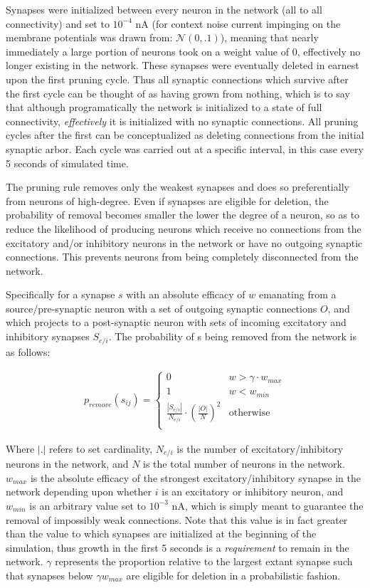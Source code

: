 \documentclass[10pt,letterpaper]{article}
\begin{document}
\label{subsec:prune}
Synapses were initialized between every neuron in the network (all to all connectivity) and set to $10^{-4}$ nA (for context noise current impinging on the membrane potentials was drawn from: $\mathcal{N}(0, .1)$), meaning that nearly immediately a large portion of neurons took on a weight value of 0, effectively no longer existing in the network. These synapses were eventually deleted in earnest upon the first pruning cycle. Thus all synaptic connections which survive after the first cycle can be thought of as having grown from nothing, which is to say that although programatically the network is initialized to a state of full connectivity, \emph{effectively} it is initialized with no synaptic connections. All pruning cycles after the first can be conceptualized as deleting connections from the initial synaptic arbor. Each cycle was carried out at a specific interval, in this case every 5 seconds of simulated time. 
	
The pruning rule removes only the weakest synapses and does so preferentially from neurons of high-degree. Even if synapses are eligible for deletion, the probability of removal becomes smaller the lower the degree of a neuron, so as to reduce the likelihood of producing neurons which receive no connections from the excitatory and/or inhibitory neurons in the network or have no outgoing synaptic connections. This prevents neurons from being completely disconnected from the network.
	
Specifically for a synapse $s$ with an absolute efficacy of $w$ emanating from a source/pre-synaptic neuron with a set of outgoing synaptic connections $O$, and which projects to a post-synaptic neuron with sets of incoming excitatory and inhibitory synapses $S_{e/i}$. The probability of s being removed from the network is as follows: 

\begin{gather}
	p_{remove}(s_{ij}) = 
	\begin{cases}
		0 & w > \gamma\cdot w_{max} \\
		1 & w < w_{min} \\
		\frac{|S_{e/i}|}{N_{e/i}} \cdot \left(\frac{|O|}{N}\right)^2 & \text{otherwise}  \\
	\end{cases}
\end{gather}
	
Where $|.|$ refers to set cardinality, $N_{e/i}$ is the number of excitatory/inhibitory neurons in the network, and $N$ is the total number of neurons in the network. $w_{max}$ is the absolute efficacy of the strongest excitatory/inhibitory synapse in the network depending upon whether $i$ is an excitatory or inhibitory neuron, and $w_{min}$ is an arbitrary value set to $10^{-3}$ nA, which is simply meant to guarantee the removal of impossibly weak connections. Note that this value is in fact greater than the value to which synapses are initialized at the beginning of the simulation, thus growth in the first 5 seconds is a \emph{requirement} to remain in the network. $\gamma$ represents the proportion relative to the largest extant synapse such that synapses below $\gamma w_{max}$ are eligible for deletion in a probabilistic fashion. 
\end{document}
